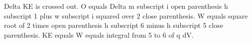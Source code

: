 Delta KE is crossed out. O equals Delta m subscript i open parenthesis h subscript 1 plus w subscript i squared over 2 close parenthesis. W equals square root of 2 times open parenthesis h subscript 6 minus h subscript 5 close parenthesis. KE equals W equals integral from 5 to 6 of q dV.
